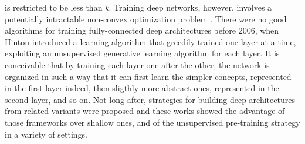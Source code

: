 is restricted to be less than \textit{k}. Training deep networks, however, involves a potentially 
intractable non-convex optimization problem \cite{bengio2009curriculum}. There were no good algorithms for training 
fully-connected deep architectures before 2006, when Hinton introduced a learning algorithm that greedily trained one layer at a time, exploiting an unsupervised
generative learning algorithm for each layer. It is conceivable that by training 
each layer one after the other, the network is organized in such a way that it can first learn the simpler
concepts, represented in the first layer indeed, then sligthly more abstract ones, represented in the second layer, and so on.
Not long after, strategies for building deep architectures from related variants were proposed %
and these works showed the advantage of those frameworks over shallow ones, and of the unsupervised 
pre-training strategy in a variety of settings.\\

